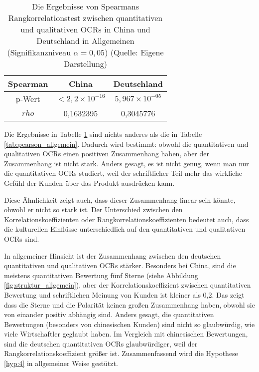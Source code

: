 \begin{table}[h]
\centering
\begin{tabular}{|c|c|c|}
\hline
Spearman & China             & Deutschland \\ \hline
p-Wert   & $< 2,2 \times 10^{-16}$ & $5,967 \times 10^{-05}$   \\ \hline
$rho$      & 0,1632395         & 0,3045776   \\ \hline
\end{tabular}
\caption[Die Ergebnisse von Spearmans Rangkorrelationstest zwischen quantitativen und qualitativen OCRs in China und Deutschland in Allgemeinen]{Die Ergebnisse von Spearmans Rangkorrelationstest zwischen quantitativen und qualitativen \ac{OCRs} in China und Deutschland in Allgemeinen (Signifikanzniveau $\alpha = 0,05$) (Quelle: Eigene Darstellung)}
\label{tab:spearman_allgemein}
\end{table}

Die Ergebnisse in Tabelle \ref{tab:spearman_allgemein} sind nichts anderes als die in Tabelle \ref{tab:pearson_allgemein}. Dadurch wird bestimmt: obwohl die quantitativen und qualitativen \ac{OCRs} einen positiven Zusammenhang haben, aber der Zusammenhang ist nicht stark. Anders gesagt, es ist nicht genug, wenn man nur die quantitativen \ac{OCRs} studiert, weil der schriftlicher Teil mehr das wirkliche Gefühl der Kunden über das Produkt ausdrücken kann. 

Diese Ähnlichkeit zeigt auch, dass dieser Zusammenhang linear sein könnte, obwohl er nicht so stark ist. Der Unterschied zwischen den Korrelationskoeffizienten oder Rangkorrelationskoeffizienten bedeutet auch, dass die kulturellen Einflüsse unterschiedlich auf den quantitativen und qualitativen \ac{OCRs} sind.

In allgemeiner Hinsicht ist der Zusammenhang zwischen den deutschen quantitativen und qualitativen \ac{OCRs} stärker. Besonders bei China, sind die meistens quantitativen Bewertung fünf Sterne (siehe Abbildung \ref{fig:struktur_allgemein}), aber der Korrelationskoeffizient zwischen quantitativen Bewertung und schriftlichen Meinung von Kunden ist kleiner als 0,2. Das zeigt dass die Sterne und die Polarität keinen großen Zusammenhang haben, obwohl sie von einander positiv abhängig sind. Anders gesagt, die quantitativen Bewertungen (besonders von chinesischen Kunden) sind nicht so glaubwürdig, wie viele Wirtschaftler geglaubt haben. Im Vergleich mit chinesischen Bewertungen, sind die deutschen quantitativen \ac{OCRs} glaubwürdiger, weil der Rangkorrelationskoeffizient größer ist. Zusammenfassend wird die Hypothese \ref{hyp:4} in allgemeiner Weise gestützt.

